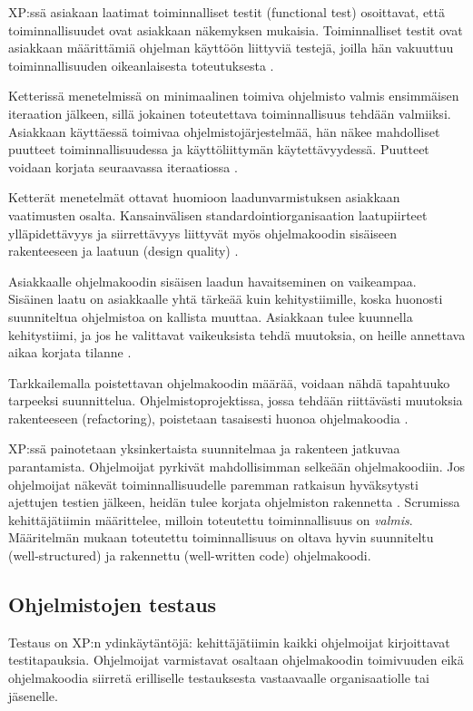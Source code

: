 \documentclass[finnish]{tktltiki2}
\theoremstyle{definition}
\theoremstyle{remark}
\begin{document}
{XP:ssä asiakaan laatimat toiminnalliset testit (functional test) osoittavat, että toiminnallisuudet ovat asiakkaan näkemyksen mukaisia. Toiminnalliset testit ovat asiakkaan määrittämiä ohjelman käyttöön liittyviä testejä, joilla hän vakuuttuu toiminnallisuuden oikeanlaisesta toteutuksesta \cite{BEC99}.

Ketterissä menetelmissä on minimaalinen toimiva ohjelmisto valmis ensimmäisen iteraation jälkeen, sillä jokainen toteutettava toiminnallisuus tehdään valmiiksi. Asiakkaan käyttäessä toimivaa ohjelmisto\-järjestelmää, hän näkee mahdolliset puutteet toiminnallisuudessa ja käyttö\-liittymän käy\-tettävyydessä. Puutteet voidaan korjata seuraavassa iteraatiossa \cite{BEC99}.

Ketterät menetelmät ottavat huomioon laadunvarmistuksen asiakkaan vaatimusten osalta. Kansainvälisen standardointiorganisaation laatupiirteet ylläpidettävyys ja siirrettävyys liittyvät myös ohjelmakoodin sisäiseen rakenteeseen ja laatuun (design quality) \cite{KIP96}.

Asiakkaalle ohjelmakoodin sisäisen laadun havaitseminen on vaikeampaa. Sisäinen laatu on asiakkaalle yhtä tärkeää kuin kehitystiimille, koska huonosti suunniteltua ohjelmistoa on kallista muuttaa. Asiakkaan tulee kuunnella kehitystiimi, ja jos he valittavat vaikeuksista tehdä muutoksia, on heille annettava aikaa korjata tilanne \cite{FOW01b}.

Tarkkailemalla poistettavan ohjelmakoodin määrää, voidaan nähdä tapahtuuko tarpeeksi suunnittelua. Ohjelmistoprojektissa, jossa tehdään riittävästi muutoksia rakenteeseen (refactoring), poistetaan tasaisesti huonoa ohjelmakoodia \cite{FOW01b}.

XP:ssä painotetaan yksinkertaista suunnitelmaa ja rakenteen jatkuvaa parantamista. Ohjelmoijat pyrkivät mahdollisimman selkeään ohjelmakoodiin. Jos ohjelmoijat näkevät toiminnallisuudelle paremman ratkaisun hyväksytysti ajettujen testien jälkeen, heidän tulee korjata ohjelmiston rakennetta \cite{BEC99}.
Scrumissa kehittäjätiimin määrittelee, milloin toteutettu toiminnallisuus on \textit{valmis}. Määritelmän mukaan toteutettu toiminnallisuus on oltava hyvin suunniteltu (well-structured) ja rakennettu (well-written code) ohjelmakoodi\cite{SCH09}.


\subsection{Ohjelmistojen testaus}

Testaus on XP:n ydinkäytäntöjä: kehittäjätiimin kaikki ohjelmoijat kirjoittavat testitapauksia. Ohjelmoijat varmistavat osaltaan ohjelmakoodin toimivuuden eikä ohjelmakoodia siirretä erilliselle testauksesta vastaavaalle organisaatiolle tai jäsenelle.

}
\end{document}
